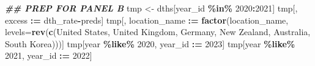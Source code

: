 \documentclass[
]{article}
\newenvironment{Shaded}{\begin{snugshade}}{\end{snugshade}}
\newcommand{\AttributeTok}[1]{\textcolor[rgb]{0.13,0.29,0.53}{#1}}
\newcommand{\DecValTok}[1]{\textcolor[rgb]{0.00,0.00,0.81}{#1}}
\newcommand{\DocumentationTok}[1]{\textcolor[rgb]{0.56,0.35,0.01}{\textbf{\textit{#1}}}}
\newcommand{\FunctionTok}[1]{\textcolor[rgb]{0.13,0.29,0.53}{\textbf{#1}}}
\newcommand{\NormalTok}[1]{#1}
\newcommand{\OtherTok}[1]{\textcolor[rgb]{0.56,0.35,0.01}{#1}}
\newcommand{\SpecialCharTok}[1]{\textcolor[rgb]{0.81,0.36,0.00}{\textbf{#1}}}
\newcommand{\StringTok}[1]{\textcolor[rgb]{0.31,0.60,0.02}{#1}}
\begin{document}
\begin{Shaded}
\begin{Highlighting}[]
\DocumentationTok{\#\# PREP FOR PANEL B}
\NormalTok{tmp }\OtherTok{\textless{}{-}}\NormalTok{ dths[year\_id }\SpecialCharTok{\%in\%} \DecValTok{2020}\SpecialCharTok{:}\DecValTok{2021}\NormalTok{]}
\NormalTok{tmp[, excess }\SpecialCharTok{:=}\NormalTok{ dth\_rate}\SpecialCharTok{{-}}\NormalTok{preds]}
\NormalTok{tmp[, location\_name }\SpecialCharTok{:=} \FunctionTok{factor}\NormalTok{(location\_name, }\AttributeTok{levels=}\FunctionTok{rev}\NormalTok{(}\FunctionTok{c}\NormalTok{(}\StringTok{\textquotesingle{}United States\textquotesingle{}}\NormalTok{, }\StringTok{\textquotesingle{}United Kingdom\textquotesingle{}}\NormalTok{, }\StringTok{\textquotesingle{}Germany\textquotesingle{}}\NormalTok{, }\StringTok{\textquotesingle{}New Zealand\textquotesingle{}}\NormalTok{, }\StringTok{\textquotesingle{}Australia\textquotesingle{}}\NormalTok{, }\StringTok{\textquotesingle{}South Korea\textquotesingle{}}\NormalTok{)))]}
\NormalTok{tmp[year }\SpecialCharTok{\%like\%} \StringTok{\textquotesingle{}2020\textquotesingle{}}\NormalTok{, year\_id }\SpecialCharTok{:=} \DecValTok{2023}\NormalTok{]}
\NormalTok{tmp[year }\SpecialCharTok{\%like\%} \StringTok{\textquotesingle{}2021\textquotesingle{}}\NormalTok{, year\_id }\SpecialCharTok{:=} \DecValTok{2022}\NormalTok{]}


\end{Highlighting}
\end{Shaded}
\end{document}

